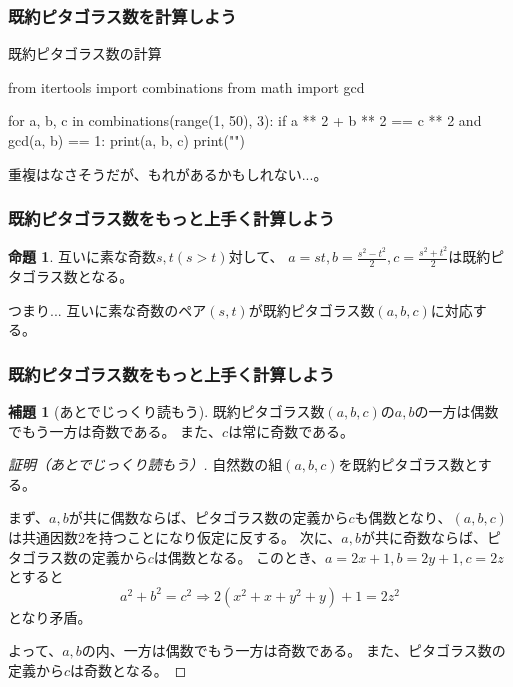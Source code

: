 \documentclass[dvipdfmx,11pt,notheorems]{beamer}
\theoremstyle{definition}
\newtheorem{proposition}{命題}
\newtheorem{lemma}{補題}
\begin{document}
\begin{frame}[fragile]\frametitle{既約ピタゴラス数を計算しよう}

\begin{block}{既約ピタゴラス数の計算}
\begin{pycode}
from itertools import combinations
from math import gcd

for a, b, c in combinations(range(1, 50), 3):
    if a ** 2 + b ** 2 == c ** 2 and gcd(a, b) == 1:
        print(a, b, c)
        print("\n")
\end{pycode}
\end{block}

重複はなさそうだが、もれがあるかもしれない...。

\end{frame}


\begin{frame}\frametitle{既約ピタゴラス数をもっと上手く計算しよう}

\begin{proposition}
互いに素な奇数$s, t (s > t)$対して、 $a = st, b = \displaystyle \frac{s^{2}-t^{2}}{2}, c = \displaystyle \frac{s^{2}+t^{2}}{2}$は既約ピタゴラス数となる。
\end{proposition}

\begin{exampleblock}{つまり...}
互いに素な奇数のペア$(s, t)$が既約ピタゴラス数$(a, b, c)$に対応する。
\end{exampleblock}

\end{frame}

\begin{frame}\frametitle{既約ピタゴラス数をもっと上手く計算しよう}

\begin{lemma}[あとでじっくり読もう]
既約ピタゴラス数$(a, b, c)$の$a, b$の一方は偶数でもう一方は奇数である。
また、$c$は常に奇数である。
\end{lemma}

\begin{proof}[証明（あとでじっくり読もう）]
自然数の組$(a, b, c)$を既約ピタゴラス数とする。

まず、$a, b$が共に偶数ならば、ピタゴラス数の定義から$c$も偶数となり、$(a, b, c)$は共通因数2を持つことになり仮定に反する。
次に、$a, b$が共に奇数ならば、ピタゴラス数の定義から$c$は偶数となる。
このとき、$a = 2x + 1, b = 2y + 1, c = 2z$とすると
\begin{equation*}
a^{2} + b^{2} = c^{2} \Rightarrow 2(x^{2} + x + y^{2} + y) + 1 = 2z^{2}
\end{equation*}
となり矛盾。

よって、$a, b$の内、一方は偶数でもう一方は奇数である。
また、ピタゴラス数の定義から$c$は奇数となる。
\end{proof}

\end{frame}
\end{document}
